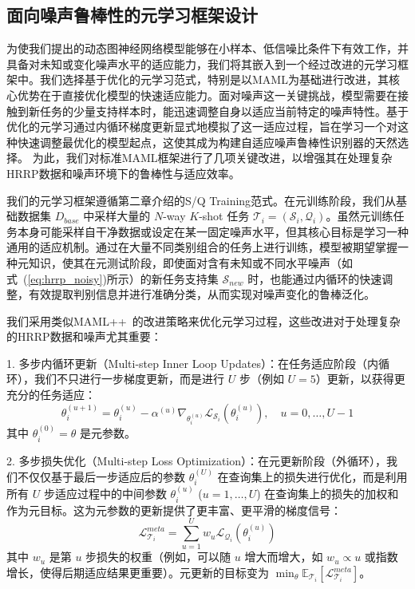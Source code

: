 \subsection{面向噪声鲁棒性的元学习框架设计}
\label{subsec:meta_learning_noise_robust}

为使我们提出的动态图神经网络模型能够在小样本、低信噪比条件下有效工作，并具备对未知或变化噪声水平的适应能力，我们将其嵌入到一个经过改进的元学习框架中。我们选择基于优化的元学习范式，特别是以MAML为基础进行改进，其核心优势在于直接优化模型的快速适应能力。面对噪声这一关键挑战，模型需要在接触到新任务的少量支持样本时，能迅速调整自身以适应当前特定的噪声特性。基于优化的元学习通过内循环梯度更新显式地模拟了这一适应过程，旨在学习一个对这种快速调整最优化的模型起点，这使其成为构建自适应噪声鲁棒性识别器的天然选择。 为此，我们对标准MAML框架进行了几项关键改进，以增强其在处理复杂HRRP数据和噪声环境下的鲁棒性与适应效率。

我们的元学习框架遵循第二章介绍的S/Q Training范式。在元训练阶段，我们从基础数据集 $D_{base}$ 中采样大量的 $N$-way $K$-shot 任务 $\mathcal{T}_i = (\mathcal{S}_i, \mathcal{Q}_i)$。虽然元训练任务本身可能采样自干净数据或设定在某一固定噪声水平，但其核心目标是学习一种通用的适应机制。通过在大量不同类别组合的任务上进行训练，模型被期望掌握一种元知识，使其在元测试阶段，即使面对含有未知或不同水平噪声（如式~(\ref{eq:hrrp_noisy})所示）的新任务支持集 $\mathcal{S}_{new}$ 时，也能通过内循环的快速调整，有效提取判别信息并进行准确分类，从而实现对噪声变化的鲁棒泛化。

我们采用类似MAML++~\cite{antoniou_how_2018, yao_model-agnostic_2021, zhou_task_2021, raghu_rapid_2020}的改进策略来优化元学习过程，这些改进对于处理复杂的HRRP数据和噪声尤其重要：

1.  多步内循环更新（Multi-step Inner Loop Updates）：在任务适应阶段（内循环），我们不只进行一步梯度更新，而是进行 $U$ 步（例如 $U=5$）更新，以获得更充分的任务适应：
    \begin{equation}
        \theta_i^{(u+1)} = \theta_i^{(u)} - \alpha^{(u)} \nabla_{\theta_i^{(u)}} \mathcal{L}_{\mathcal{S}_i}(\theta_i^{(u)}), \quad u=0, \dots, U-1
        \label{eq:multi_step_inner_update}
    \end{equation}
    其中 $\theta_i^{(0)} = \theta$ 是元参数。

2.  多步损失优化（Multi-step Loss Optimization）：在元更新阶段（外循环），我们不仅仅基于最后一步适应后的参数 $\theta_i^{(U)}$ 在查询集上的损失进行优化，而是利用所有 $U$ 步适应过程中的中间参数 $\theta_i^{(u)}$ ($u=1, \dots, U$) 在查询集上的损失的加权和作为元目标。这为元参数的更新提供了更丰富、更平滑的梯度信号：
    \begin{equation}
        \mathcal{L}_{\mathcal{T}_i}^{meta} = \sum_{u=1}^{U} w_u \mathcal{L}_{\mathcal{Q}_i}(\theta_i^{(u)})
        \label{eq:multi_step_loss}
    \end{equation}
    其中 $w_u$ 是第 $u$ 步损失的权重（例如，可以随 $u$ 增大而增大，如 $w_u \propto u$ 或指数增长，使得后期适应结果更重要）。元更新的目标变为 $\min_{\theta} \mathbb{E}_{\mathcal{T}_i} [\mathcal{L}_{\mathcal{T}_i}^{meta}]$。


